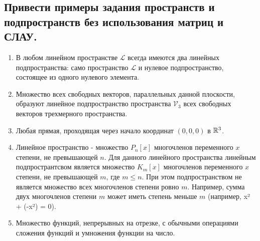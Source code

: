 \subsection{
    Привести примеры задания пространств и подпространств без использования матриц и СЛАУ.
}

\begin{enumerate}
    \item В любом линейном пространстве $\mathcal{L}$ всегда имеются два линейных подпространства: само пространство $\mathcal{L}$ и нулевое подпространство, состоящее из одного нулевого элемента.
    \item Множество всех свободных векторов, параллельных данной плоскости, образуют линейное подпространство пространства $\mathcal{V}_3$ всех свободных векторов трехмерного пространства.
    \item Любая прямая, проходящая через начало координат $(0, 0, 0)$ в $\mathbb{R}^3$.
    \item Линейное пространство - множество $P_n[x]$ многочленов переменного $x$ степени, не превышающей $n$. Для данного линейного пространства линейным подпространтсвом является множество $K_m[x]$ многочленов переменного $x$ степени, не превышающей $m$, где $m \leq n$. При этом подпространством не является множество всех многочленов степени ровно $m$. Например, сумма двух многочленов степени $m$ может иметь степень меньше $m$ (например, x² + (-x²) = 0).
    \item Множество функций, непрерывных на отрезке, с обычными операциями сложения функций и умножения функции на число.
\end{enumerate}
